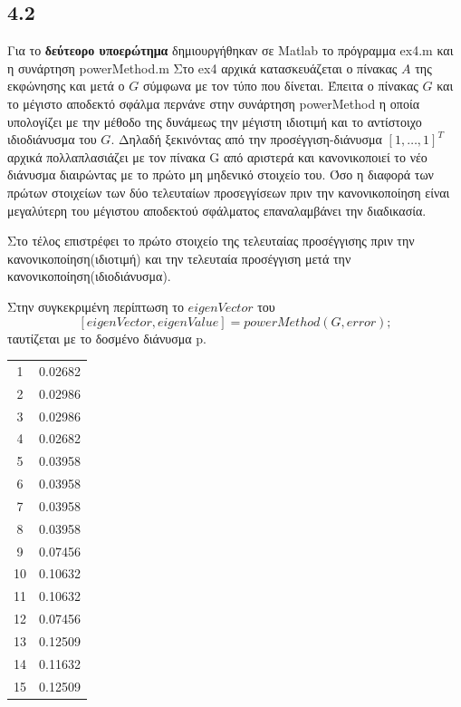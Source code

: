 \documentclass[a4paper,11pt]{article}
\begin{document}
\begin{flushleft}
\subsection*{4.2}
Για το \textbf{δεύτεορο υποερώτημα} δημιουργήθηκαν σε Matlab το πρόγραμμα ex4.m και η συνάρτηση powerMethod.m
\linebreak
Στο ex4 αρχικά κατασκευάζεται ο πίνακας $A$ της εκφώνησης και μετά ο $G$ σύμφωνα με τον τύπο που δίνεται. Έπειτα ο πίνακας $G$ και το μέγιστο αποδεκτό σφάλμα περνάνε στην συνάρτηση powerMethod η οποία υπολογίζει με την μέθοδο της δυνάμεως την μέγιστη ιδιοτιμή και το αντίστοιχο ιδιοδιάνυσμα του $G$.
\linebreak
Δηλαδή ξεκινόντας από την προσέγγιση-διάνυσμα $[1,\dots,1]^T$ αρχικά πολλαπλασιάζει με τον πίνακα G από αριστερά και κανονικοποιεί το νέο διάνυσμα διαιρώντας με το πρώτο μη μηδενικό στοιχείο του. Όσο η διαφορά των πρώτων στοιχείων των δύο τελευταίων προσεγγίσεων πριν την κανονικοποίηση είναι μεγαλύτερη του μέγιστου αποδεκτού σφάλματος επαναλαμβάνει την διαδικασία.

Στο τέλος επιστρέφει το πρώτο στοιχείο της τελευταίας προσέγγισης πριν την κανονικοποίηση(ιδιοτιμή) και την τελευταία προσέγγιση μετά την κανονικοποίηση(ιδιοδιάνυσμα).

Στην συγκεκριμένη περίπτωση το $eigenVector$ του $$[eigenVector,eigenValue] = powerMethod(G,error);$$ ταυτίζεται με το δοσμένο διάνυσμα p.
\begin{center}
    \begin{tabular}{|c|c|}
        \hline
        1 & 0.02682 \\
        2 & 0.02986 \\
        3 & 0.02986 \\
        4 & 0.02682 \\
        5 & 0.03958 \\
        6 & 0.03958 \\
        7 & 0.03958 \\
        8 & 0.03958 \\
        9 & 0.07456 \\
        10 & 0.10632 \\
        11 & 0.10632 \\
        12 & 0.07456 \\
        13 & 0.12509 \\
        14 & 0.11632 \\
        15 & 0.12509 \\
        \hline
    \end{tabular}
\end{center}


\end{flushleft}
\end{document}
